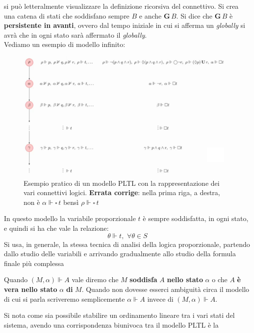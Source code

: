 \documentclass[a4paper,12pt, oneside]{book}
\begin{document}
\begin{esempio}
\begin{figure}[H]
  \end{figure}
  si può letteralmente visualizzare la definizione ricorsiva del connettivo. Si
  crea una catena di stati che soddisfano sempre $B$ e anche $\mathbf{G}\,B$. Si
  dice che $\mathbf{G}\,B$ è \textbf{persistente in avanti}, ovvero dal tempo
  iniziale in cui si afferma un \emph{globally} si avrà che in ogni stato sarà
  affermato il \emph{globally}.\\
  \newpage
  Vediamo un esempio di modello infinito:
  \begin{figure}[H]
    \centering
    \includegraphics[scale = 0.4]{img/pltl6.png}
    \caption{Esempio pratico di un modello PLTL con la rappresentazione dei vari
      connettivi logici. \textbf{Errata corrige}: nella prima riga, a destra, non
      è $\alpha\Vdash \square \, t$ bensì $\rho\Vdash \square \, t$}
  \end{figure}
  In questo modello la variabile proporzionale $t$ è sempre soddisfatta, in ogni
  stato, e quindi si ha che vale la relazione:
  \[\theta\Vdash t,\,\,\forall \theta \in S\]
  Si usa, in generale, la stessa tecnica di analisi della logica proporzionale,
  partendo dallo studio delle variabili e arrivando gradualmente allo studio
  della formula finale più complessa
\end{esempio}
\begin{definizione}
  Quando $(M,\alpha)\Vdash A$ vale diremo che $M$ \textbf{soddisfa} $A$
  \textbf{nello stato} $\alpha$ o che $A$ \textbf{è vera nello stato} $\alpha$
  \textbf{di} $M$. Quando non dovesse esserci ambiguità circa il modello di cui
  si parla scriveremo semplicemente $\alpha\Vdash A$ invece di $(M,\alpha)\Vdash
  A$.  
\end{definizione}
\newpage
Si nota come sia possibile stabilire un ordinamento lineare tra i vari stati
del sistema, avendo una corrispondenza biunivoca tra il modello PLTL è la
\end{document}
